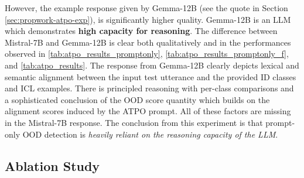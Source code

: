 However, the example response given by Gemma-12B (see the quote in Section \ref{sec:propwork-atpo-exp}), is significantly higher quality. Gemma-12B is an LLM which demonstrates \textbf{high capacity for reasoning}. The difference between Mistral-7B and Gemma-12B is clear both qualitatively and in the performances observed in \ref{tab:atpo_results_promptonly}, \ref{tab:atpo_results_promptonly_f}, and \ref{tab:atpo_results}. The response from Gemma-12B clearly depicts lexical and semantic alignment between the input test utterance and the provided ID classes and ICL examples. There is principled reasoning with per-class comparisons and a sophisticated conclusion of the OOD score quantity which builds on the alignment scores induced by the ATPO prompt. All of these factors are missing in the Mistral-7B response. The conclusion from this experiment is that prompt-only OOD detection is \textit{heavily reliant on the reasoning capacity of the LLM}.

\subsection{Ablation Study}

\begin{table}[t!]
\centering
\vspace{0.1cm}
\caption{Ablation mean OOD detection results (AUC) for \syst over number of included ICL examples $\nu$.}
\label{tab:atpo_results-icl}
\end{table}

